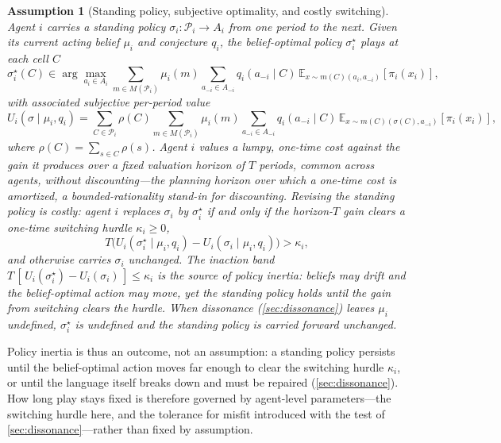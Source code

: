 \documentclass[11pt]{article}
\newtheorem{assumption}{Assumption}[section]
\theoremstyle{definition}
\begin{document}
\begin{assumption}[Standing policy, subjective optimality, and costly switching]
\label{ass:commitment}
Agent $i$ carries a \emph{standing policy} $\sigma_i:\mathcal P_i\to A_i$ from one period to the next.
Given its current acting belief $\mu_i$ and conjecture $q_i$, the \emph{belief-optimal} policy $\sigma_i^{\star}$ plays at each cell $C$
\begin{equation}
\sigma_i^{\star}(C)\in\arg\max_{a_i\in A_i}
\sum_{m\in M(\mathcal P_i)}\mu_i(m)
\sum_{a_{-i}\in A_{-i}}q_i(a_{-i}\mid C)\,
\mathbb E_{x\sim m(C)(a_i,a_{-i})}\!\left[\pi_i(x_i)\right],
\label{eq:subjective-optimality}
\end{equation}
with associated subjective per-period value
\begin{equation}
U_i(\sigma\mid\mu_i,q_i)=\sum_{C\in\mathcal P_i}\rho(C)\sum_{m\in M(\mathcal P_i)}\mu_i(m)\sum_{a_{-i}\in A_{-i}}q_i(a_{-i}\mid C)\,\mathbb E_{x\sim m(C)(\sigma(C),a_{-i})}\!\left[\pi_i(x_i)\right],
\label{eq:subjective-value}
\end{equation}
where $\rho(C)=\sum_{s\in C}\rho(s)$.
Agent $i$ values a lumpy, one-time cost against the gain it produces over a fixed \emph{valuation horizon} of $T$ periods, common across agents, without discounting---the planning horizon over which a one-time cost is amortized, a bounded-rationality stand-in for discounting.
Revising the standing policy is costly: agent $i$ replaces $\sigma_i$ by $\sigma_i^{\star}$ if and only if the horizon-$T$ gain clears a one-time \emph{switching hurdle} $\kappa_i\ge0$,
\[
T\bigl(U_i(\sigma_i^{\star}\mid\mu_i,q_i)-U_i(\sigma_i\mid\mu_i,q_i)\bigr)>\kappa_i,
\]
and otherwise carries $\sigma_i$ unchanged.
The inaction band $T\,[\,U_i(\sigma_i^{\star})-U_i(\sigma_i)\,]\le\kappa_i$ is the source of policy inertia: beliefs may drift and the belief-optimal action may move, yet the standing policy holds until the gain from switching clears the hurdle.
When dissonance (\cref{sec:dissonance}) leaves $\mu_i$ undefined, $\sigma_i^{\star}$ is undefined and the standing policy is carried forward unchanged.
\end{assumption}

Policy inertia is thus an outcome, not an assumption: a standing policy persists until the belief-optimal action moves far enough to clear the switching hurdle $\kappa_i$, or until the language itself breaks down and must be repaired (\cref{sec:dissonance}).
How long play stays fixed is therefore governed by agent-level parameters---the switching hurdle here, and the tolerance for misfit introduced with the test of \cref{sec:dissonance}---rather than fixed by assumption.
\end{document}
